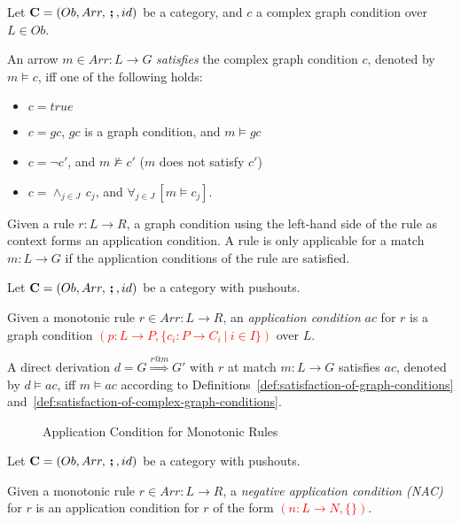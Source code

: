 \begin{definition}
	\label{def:satisfaction-of-complex-graph-conditions}%
	Let $\mathbf{C} = (Ob, Arr, \textbf{\,;\,} , id)$ be a category, and $c$ a complex graph condition over $L \in Ob$.

	\gap
	An arrow $m \in Arr: L \rightarrow G$ \emph{satisfies} the complex graph condition $c$, denoted by $m \models c$, iff one of the following holds:
	\begin{itemize}
		\item $c = true$
		\item $c = gc$, $gc$ is a graph condition, and $m \models gc$
		\item $c = \neg c'$, and $m \not\models c'$ ($m$ does not satisfy $c'$)
		\item $c = \wedge_{j \in J}\, c_j$, and $\forall_{j \in J}\, [m \models c_j]$.  
	\end{itemize}
\end{definition}

\noindent
Given a rule $r: L \rightarrow R$, a graph condition using the left-hand side of the rule as context forms an application condition.
A rule is only applicable for a match $m: L \rightarrow G$ if the application conditions of the rule are satisfied.

\begin{definition}
	\label{def:application-conditions}%
	Let  $\mathbf{C} = (Ob, Arr, \textbf{\,;\,} , id)$ be a category with pushouts.

	\gap
	Given a monotonic rule $r \in Arr: L \rightarrow R$, an \emph{application condition} $ac$ for $r$ is a graph condition \textcolor{red}{$(p: L \rightarrow P, \{ c_i: P \rightarrow C_i ~|~ i \in I \})$} over $L$.

	\gap
	A direct derivation $d = G \stackrel{r@m}{\Longrightarrow} G'$ with $r$ at match $m: L \rightarrow G$ satisfies $ac$, denoted by $d \models ac$, iff $m \models ac$ according to Definitions~\ref{def:satisfaction-of-graph-conditions} and~\ref{def:satisfaction-of-complex-graph-conditions}. 
\end{definition}

\begin{figure}[h!]
	\centering
	
	\caption{Application Condition for Monotonic Rules}
	\label{fig:application-condition}
\end{figure}

\begin{definition}
	\label{def:nacs}%
	Let  $\mathbf{C} = (Ob, Arr, \textbf{\,;\,} , id)$ be a category with pushouts.

	\gap
	Given a monotonic rule $r \in Arr: L \rightarrow R$, a \emph{negative application condition (NAC)} for $r$ is an application condition for $r$ of the form \textcolor{red}{$(n: L \rightarrow N, \{\})$}.
\end{definition}

